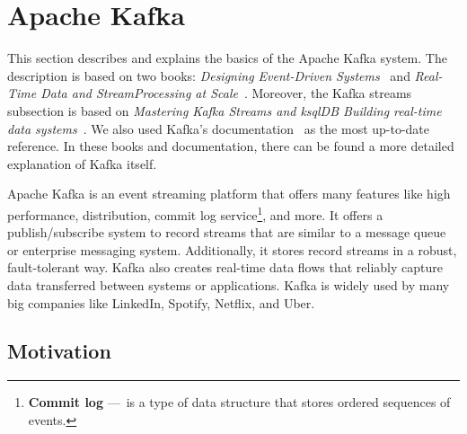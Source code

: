 \section{Apache Kafka}
\label{02:sec:title}

This section describes and explains the basics of the Apache Kafka system.
The description is based on two books: \emph{Designing Event-Driven Systems}~\cite{apacheKafkaDesignDistributedSystems} and \emph{Real-Time Data and StreamProcessing at Scale}~\cite{apacheKafkaDefinitiveGuide}.
Moreover, the Kafka streams subsection is based on \emph{Mastering Kafka Streams and ksqlDB Building real-time data systems}~\cite{kafkaStreamsBook}.
We also used Kafka's documentation~\cite{kafkaDocumentation} as the most up-to-date reference.
In these books and documentation, there can be found a more detailed explanation of Kafka itself.

Apache Kafka is an event streaming platform that offers many features like high performance, distribution, commit log service\footnote{\textbf{Commit log} 
---\ is a type of data structure that stores ordered sequences of events.}, and more.
It offers a publish/subscribe system to record streams that are similar to a message queue or enterprise messaging system.
Additionally, it stores record streams in a robust, fault-tolerant way.
Kafka also creates real-time data flows that reliably capture data transferred between systems or applications.
Kafka is widely used by many big companies like LinkedIn, Spotify, Netflix, and Uber.
\subsection{Motivation~\cite{02-bachelor-thesis}}
\label{kafka:motivation}

